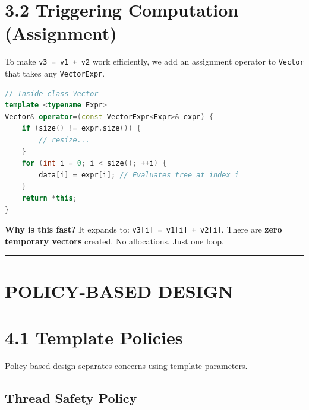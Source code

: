 \hypertarget{triggering-computation-assignment}{%
\section{3.2 Triggering Computation
(Assignment)}\label{triggering-computation-assignment}}

To make \passthrough{\lstinline!v3 = v1 + v2!} work efficiently, we add
an assignment operator to \passthrough{\lstinline!Vector!} that takes
any \passthrough{\lstinline!VectorExpr!}.

\begin{lstlisting}[language={C++}]
// Inside class Vector
template <typename Expr>
Vector& operator=(const VectorExpr<Expr>& expr) {
    if (size() != expr.size()) {
        // resize...
    }
    for (int i = 0; i < size(); ++i) {
        data[i] = expr[i]; // Evaluates tree at index i
    }
    return *this;
}
\end{lstlisting}

\textbf{Why is this fast?} It expands to:
\passthrough{\lstinline!v3[i] = v1[i] + v2[i]!}. There are \textbf{zero
temporary vectors} created. No allocations. Just one loop.

\begin{center}\rule{0.5\linewidth}{0.5pt}\end{center}

\hypertarget{policy-based-design}{%
\section{POLICY-BASED DESIGN}\label{policy-based-design}}

\hypertarget{template-policies}{%
\section{4.1 Template Policies}\label{template-policies}}

Policy-based design separates concerns using template parameters.

\hypertarget{thread-safety-policy}{%
\subsection{Thread Safety Policy}\label{thread-safety-policy}}

